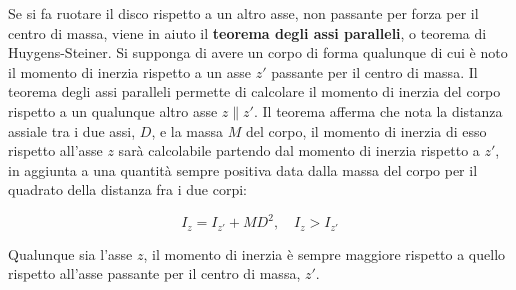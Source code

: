 Se si fa ruotare il disco rispetto a un altro asse, non passante per forza per il centro di massa,  viene in aiuto il \textbf{teorema degli assi paralleli}, o teorema di Huygens-Steiner. Si supponga di avere un corpo di forma qualunque di cui è noto il momento di inerzia rispetto a un asse $z'$ passante per il centro di massa. Il teorema degli assi paralleli permette di calcolare il momento di inerzia del corpo rispetto a un qualunque altro asse $z \parallel z'$. Il teorema afferma che nota la distanza assiale tra i due assi, $D$, e la massa $M$ del corpo, il momento di inerzia di esso rispetto all'asse $z$ sarà calcolabile partendo dal momento di inerzia rispetto a $z'$, in aggiunta a una quantità sempre positiva data dalla massa del corpo per il quadrato della distanza fra i due corpi:

\[
	\boxed{I_z = I_{z'} + MD^2, \quad I_z > I_{z'}}
\]

Qualunque sia l'asse $z$, il momento di inerzia è sempre maggiore rispetto a quello rispetto all'asse passante per il centro di massa, $z'$.

